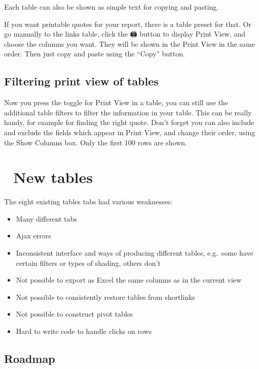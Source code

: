 \documentclass[
]{book}
\begin{document}
Each table can also be shown as simple text for copying and pasting.

If you want printable quotes for your report, there is a table preset for that. Or go manually to the links table, click the 🖨️ button to display Print View, and choose the columns you want. They will be shown in the Print View in the same order. Then just copy and paste using the ``Copy'' button.

\hypertarget{filtering-print-view-of-tables}{%
\subsection{Filtering print view of tables}\label{filtering-print-view-of-tables}}

Now you press the toggle for Print View in a table, you can still use the additional table filters to filter the information in your table. This can be really handy, for example for finding the right quote. Don't forget you can also include and exclude the fields which appear in Print View, and change their order, using the Show Columns box. Only the first 100 rows are shown.

\hypertarget{new-tables}{%
\section{🧪 New tables}\label{new-tables}}

The eight existing tables tabs had various weaknesses:

\begin{itemize}
\item
  Many different tabs
\item
  Ajax errors
\item
  Inconsistent interface and ways of producing different tables, e.g.~some have certain filters or types of shading, others don't
\item
  Not possible to export as Excel the same columns as in the current view
\item
  Not possible to consistently restore tables from shortlinks
\item
  Not possible to construct pivot tables
\item
  Hard to write code to handle clicks on rows
\end{itemize}

\hypertarget{roadmap}{%
\subsection{Roadmap}\label{roadmap}}
\end{document}
